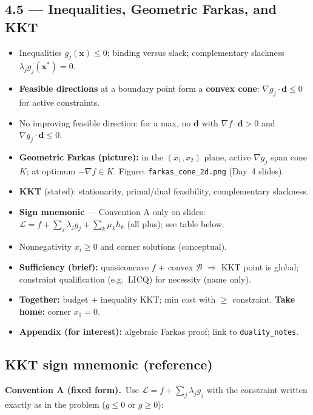 \documentclass[11pt,a4paper]{article}
\begin{document}
\subsection{4.5 --- Inequalities, Geometric Farkas, and KKT}
\begin{itemize}[leftmargin=*]
    \item Inequalities $g_j(\mathbf{x})\le 0$; binding versus slack; complementary slackness
      $\lambda_j g_j(\mathbf{x}^*)=0$.
    \item \textbf{Feasible directions} at a boundary point form a \textbf{convex cone}:
      $\nabla g_j\cdot\mathbf{d}\le 0$ for active constraints.
    \item No improving feasible direction: for a max, no $\mathbf{d}$ with
      $\nabla f\cdot\mathbf{d}>0$ and $\nabla g_j\cdot\mathbf{d}\le 0$.
    \item \textbf{Geometric Farkas (picture):} in the $(x_1,x_2)$ plane, active $\nabla g_j$ span cone $K$;
      at optimum $-\nabla f\in K$. Figure: \texttt{farkas\_cone\_2d.png} (Day~4 slides).
    \item \textbf{KKT} (stated): stationarity, primal/dual feasibility, complementary slackness.
    \item \textbf{Sign mnemonic} --- Convention A only on slides: $\mathcal{L}=f+\sum_j\lambda_j g_j+\sum_k\mu_k h_k$
      (all plus); see table below.
    \item Nonnegativity $x_i\ge 0$ and corner solutions (conceptual).
    \item \textbf{Sufficiency (brief):} quasiconcave $f$ + convex $\mathcal{B}$ $\Rightarrow$ KKT point is global;
      constraint qualification (e.g.\ LICQ) for necessity (name only).
    \item \textbf{Together:} budget + inequality KKT; min cost with $\ge$ constraint.
      \textbf{Take home:} corner $x_1=0$.
    \item \textbf{Appendix (for interest):} algebraic Farkas proof; link to \texttt{duality\_notes}.
\end{itemize}

\subsection{KKT sign mnemonic (reference)}

\noindent\textbf{Convention A (fixed form).}\ Use $\mathcal{L}=f+\sum_j\lambda_j g_j$ with the constraint
written exactly as in the problem ($g\le 0$ or $g\ge 0$):
\end{document}
